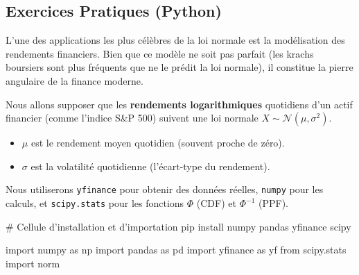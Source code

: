 \subsection{Exercices Pratiques (Python)}

L'une des applications les plus célèbres de la loi normale est la modélisation des rendements financiers. Bien que ce modèle ne soit pas parfait (les krachs boursiers sont plus fréquents que ne le prédit la loi normale), il constitue la pierre angulaire de la finance moderne.

Nous allons supposer que les \textbf{rendements logarithmiques} quotidiens d'un actif financier (comme l'indice S\&P 500) suivent une loi normale $X \sim \mathcal{N}(\mu, \sigma^2)$.

\begin{itemize}
    \item $\mu$ est le rendement moyen quotidien (souvent proche de zéro).
    \item $\sigma$ est la volatilité quotidienne (l'écart-type du rendement).
\end{itemize}

Nous utiliserons \texttt{yfinance} pour obtenir des données réelles, \texttt{numpy} pour les calculs, et \texttt{scipy.stats} pour les fonctions $\Phi$ (CDF) et $\Phi^{-1}$ (PPF).

\begin{codecell}
# Cellule d'installation et d'importation
pip install numpy pandas yfinance scipy
\end{codecell}

\begin{codecell}
import numpy as np
import pandas as pd
import yfinance as yf
from scipy.stats import norm
\end{codecell}

